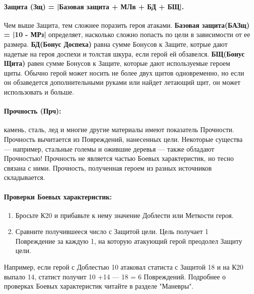 \paragraph{Защита (Зщ) = |Базовая защита + МЛв + БД + БЩ|.} Чем выше Защита, тем сложнее поразить героя атаками.
\newline \textbf{Базовая защита(БАЗщ) = |10 - МРз|} определяет, насколько сложно попасть по цели в зависимости от ее размера.
\newline \textbf{БД(Бонус Доспеха)} равна сумме Бонусов к Защите, котрые дают надетые на героя доспехи и толстая шкура, если герой ей обзавелся.
\newline \textbf{БЩ(Бонус Щита)} равен сумме Бонусов к Защите, которые дают используемые героем щиты. Обычно герой может носить не более двух щитов одновременно, но если он обзаведется дополнительными руками или найдет летающий щит, он может использовать и больше.
\paragraph{Прочность (Прч):} камень, сталь, лед и многие другие материалы имеют показатель Прочности. Прочность вычитается из Повреждений, нанесенных цели. Некоторые существа — например, стальные големы и ожившие деревья — также обладают Прочностью! Прочность не является частью Боевых характеристик, но тесно связана с ними.
\newline Прочность, полученная героем из разных источников складывается.
\paragraph{Проверки Боевых характеристик:}
\begin{enumerate}
\item Бросьте К20 и прибавьте к нему значение Доблести или Меткости героя.
\item Сравните получившееся число с Защитой цели. Цель получает 1 Повреждение за каждую 1, на которую атакующий герой преодолел Защиту цели.
\end{enumerate}
Например, если герой с Доблестью 10 атаковал статиста с Защитой 18 и на К20 выпало 14, статист получит 10 +14 — 18 = 6 Повреждений.
\newline
Подробнее о проверках Боевых характеристик читайте в разделе "Маневры".
